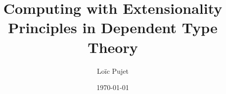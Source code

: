 \documentclass[
	a4paper, %
	fontsize=10pt, %
	twoside=false, %
	numbers=noenddot, %
]{kaobook}
\begin{document}


\titlehead{Computing with Extensionality Principles}
\subject{Thèse de Doctorat}

\title[Computing with Extensionality Principles]{Computing with Extensionality Principles in Dependent Type Theory}

\author[Loïc Pujet]{Loïc Pujet}

\date{\today}

\publishers{École Doctorale MathSTIC}


\frontmatter %





\end{document}
